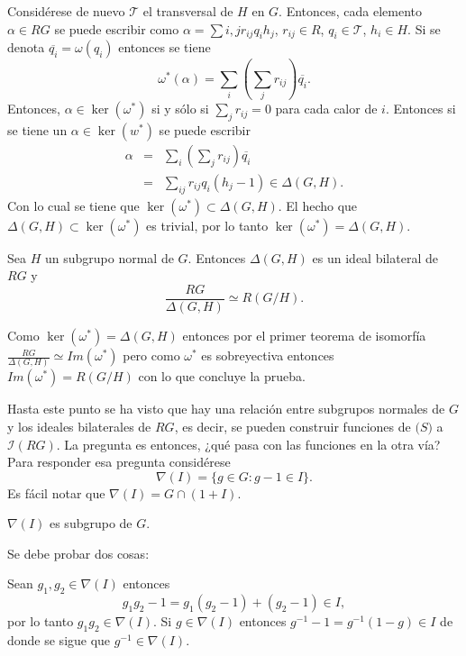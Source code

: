 \begin{proof*}
Considérese de nuevo $\mathcal{T}$ el transversal de $H$ en $G$. Entonces, cada elemento $\alpha \in RG$ se puede escribir como $ \alpha = \sum{i,j} r_{ij} q_ih_j$, $r_{ij} \in R$, $q_i \in \mathcal{T}$, $h_i \in H$. Si se denota $\overline{q_i} = \omega(q_i)$ entonces se tiene
\[\omega^*(\alpha) = \sum_i\left(\sum_jr_{ij}\right)\overline{q_i}. \]
Entonces, $\alpha \in \ker(\omega^*)$ si y sólo si $ \sum_jr_{ij} = 0 $ para cada calor de $i$. Entonces si se tiene un $\alpha \in \ker(w^*)$ se puede escribir
\begin{eqnarray*}
\alpha &=& \sum_i\left(\sum_jr_{ij}\right)\overline{q_i} \\
 &=& \sum_{ij}r_{ij}q_i(h_j-1) \in \Delta(G,H).  
\end{eqnarray*}
Con lo cual se tiene que $\ker(\omega^*) \subset \Delta(G,H)$. El hecho que $\Delta(G,H) \subset \ker(\omega^*)$ es trivial, por lo tanto $\ker(\omega^*) = \Delta(G,H)$.
\end{proof*}
\begin{corolario}
Sea $H$ un subgrupo normal de $G$. Entonces $\Delta(G,H)$ es un ideal bilateral de $RG$ y
\[\frac{RG}{\Delta(G,H)} \simeq R(G/H).\]
\end{corolario}
\begin{proof*}
Como $\ker(\omega^*) = \Delta(G,H)$ entonces por el primer teorema de isomorfía $ \frac{RG}{\Delta(G,H)} \simeq Im(\omega^*) $ pero como $\omega^*$ es sobreyectiva entonces $Im(\omega^*) = R(G/H)$ con lo que concluye la prueba. 
\end{proof*}
Hasta este punto se ha visto que hay una relación entre subgrupos normales de $G$ y los ideales bilaterales de $RG$, es decir, se pueden construir funciones de $\mathcal(S) $ a $\mathcal{I}(RG)$. La pregunta es entonces, ¿qué pasa con las funciones en la otra vía? Para responder esa pregunta considérese 
\[\nabla(I) = \{ g \in G \colon  g-1 \in I\}.\]
Es fácil notar que $\nabla(I) = G \cap (1+I)$.
\begin{lema}
$\nabla(I)$ es subgrupo de $G$.
\end{lema}
\begin{proof*}
Se debe probar dos cosas:
\begin{bulletList}
\newItem Sean $g_1,g_2 \in \nabla(I)$ entonces 
\[g_1g_2 -1 = g_1(g_2-1) + (g_2-1) \in I, \]
por lo tanto $g_1g_2 \in \nabla(I)$.
\newItem Si $g \in \nabla(I)$ entonces $g^{-1} -1 = g^{-1}(1-g) \in I$ de donde se sigue que $g^{-1} \in \nabla(I)$.\qedhere 
\end{bulletList}
\end{proof*}

